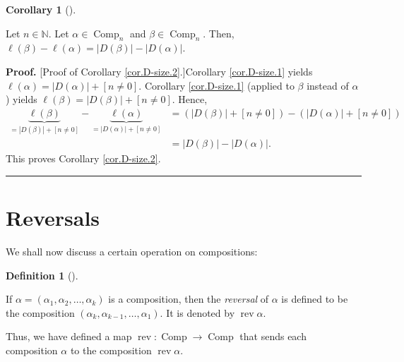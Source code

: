 \documentclass[numbers=enddot,12pt,final,onecolumn,notitlepage]{scrartcl}%
\theoremstyle{definition}
\newtheorem{defi}[theo]{Definition}
\newenvironment{definition}[1][]
{\begin{defi}[#1]\begin{leftbar}}
{\end{leftbar}\end{defi}}
\newtheorem{coro}[theo]{Corollary}
\newenvironment{corollary}[1][]
{\begin{coro}[#1]\begin{leftbar}}
{\end{leftbar}\end{coro}}
\newenvironment{proof}[1][Proof]{\noindent\textbf{#1.} }{\ \rule{0.5em}{0.5em}}
\begin{document}
\begin{corollary}
\label{cor.D-size.2}Let $n\in\mathbb{N}$. Let $\alpha\in\operatorname*{Comp}%
\nolimits_{n}$ and $\beta\in\operatorname*{Comp}\nolimits_{n}$. Then,
$\ell\left(  \beta\right)  -\ell\left(  \alpha\right)  =\left\vert D\left(
\beta\right)  \right\vert -\left\vert D\left(  \alpha\right)  \right\vert $.
\end{corollary}

\begin{proof}
[Proof of Corollary \ref{cor.D-size.2}.]Corollary \ref{cor.D-size.1} yields
$\ell\left(  \alpha\right)  =\left\vert D\left(  \alpha\right)  \right\vert
+\left[  n\neq0\right]  $. Corollary \ref{cor.D-size.1} (applied to $\beta$
instead of $\alpha$) yields $\ell\left(  \beta\right)  =\left\vert D\left(
\beta\right)  \right\vert +\left[  n\neq0\right]  $. Hence,%
\begin{align*}
\underbrace{\ell\left(  \beta\right)  }_{=\left\vert D\left(  \beta\right)
\right\vert +\left[  n\neq0\right]  }-\underbrace{\ell\left(  \alpha\right)
}_{=\left\vert D\left(  \alpha\right)  \right\vert +\left[  n\neq0\right]  }
&  =\left(  \left\vert D\left(  \beta\right)  \right\vert +\left[
n\neq0\right]  \right)  -\left(  \left\vert D\left(  \alpha\right)
\right\vert +\left[  n\neq0\right]  \right) \\
&  =\left\vert D\left(  \beta\right)  \right\vert -\left\vert D\left(
\alpha\right)  \right\vert .
\end{align*}
This proves Corollary \ref{cor.D-size.2}.
\end{proof}

\section{Reversals}

We shall now discuss a certain operation on compositions:

\begin{definition}
\label{def.rev-comp}If $\alpha=\left(  \alpha_{1},\alpha_{2},\ldots,\alpha
_{k}\right)  $ is a composition, then the \emph{reversal} of $\alpha$ is
defined to be the composition $\left(  \alpha_{k},\alpha_{k-1},\ldots
,\alpha_{1}\right)  $. It is denoted by $\operatorname*{rev}\alpha$.

Thus, we have defined a map $\operatorname*{rev}:\operatorname*{Comp}%
\rightarrow\operatorname*{Comp}$ that sends each composition $\alpha$ to the
composition $\operatorname*{rev}\alpha$.
\end{definition}
\end{document}
